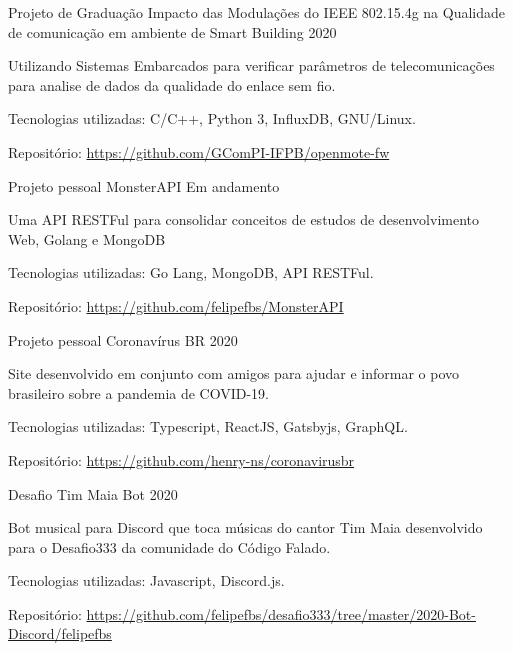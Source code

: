 
\begin{cventries}
  \cventry
  {Projeto de Graduação} %
  {Impacto das Modulações do IEEE 802.15.4g na Qualidade de comunicação em ambiente de Smart Building} %
  {} %
  {2020} %
  {
    \begin{cvitems} %
      \item {Utilizando Sistemas Embarcados para verificar parâmetros de telecomunicações para analise de dados da qualidade do enlace sem fio.}
      \item {Tecnologias utilizadas: C/C++, Python 3, InfluxDB, GNU/Linux.}
      \item {Repositório: \url{https://github.com/GComPI-IFPB/openmote-fw}}
    \end{cvitems}
  }

  \cventry
  {Projeto pessoal} %
  {MonsterAPI} %
  {} %
  {Em andamento} %
  {
    \begin{cvitems} %
      \item {Uma API RESTFul para consolidar conceitos de estudos de desenvolvimento Web, Golang e MongoDB}
      \item {Tecnologias utilizadas: Go Lang, MongoDB, API RESTFul.}
      \item {Repositório: \url{https://github.com/felipefbs/MonsterAPI}}
    \end{cvitems}
  }

  \cventry
  {Projeto pessoal} %
  {Coronavírus BR} %
  {} %
  {2020} %
  {
    \begin{cvitems} %
      \item {Site desenvolvido em conjunto com amigos para ajudar e informar o povo brasileiro sobre a pandemia de COVID-19.}
      \item {Tecnologias utilizadas: Typescript, ReactJS, Gatsbyjs, GraphQL.}
      \item {Repositório: \url{https://github.com/henry-ns/coronavirusbr}}
    \end{cvitems}
  }

  \cventry
  {Desafio} %
  {Tim Maia Bot} %
  {} %
  {2020} %
  {
    \begin{cvitems} %
      \item {Bot musical para Discord que toca músicas do cantor Tim Maia desenvolvido para o Desafio333 da comunidade do Código Falado.}
      \item {Tecnologias utilizadas: Javascript, Discord.js.}
      \item {Repositório: \url{https://github.com/felipefbs/desafio333/tree/master/2020-Bot-Discord/felipefbs}}
    \end{cvitems}
  }


\end{cventries}
